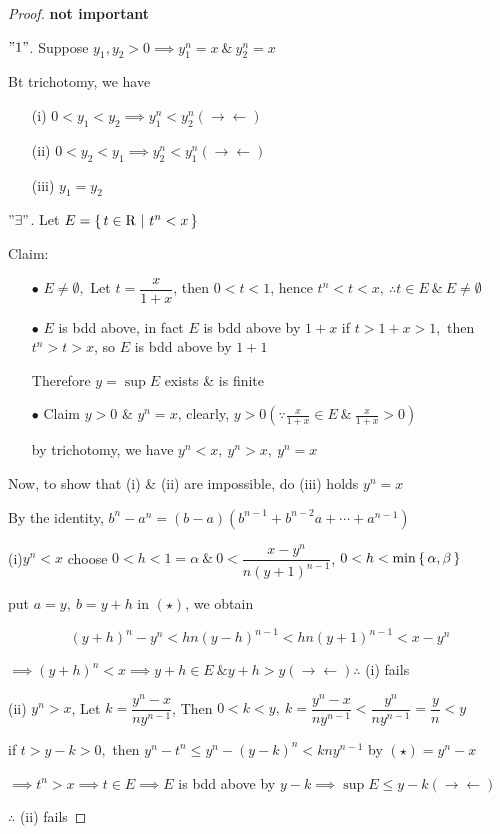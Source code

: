 \begin{proof}
	\textbf{\color{blue} not important}
	
	$"1"$. Suppose $y_1,y_2 > 0 \implies y_1^n = x ~\&~ y_2^n = x$
	
	Bt trichotomy,  we have 
	
	\begin{enumerate}
		\item[(i)]  $0<y_1<y_2 \implies y_1^n < y_2^n (\rightarrow\leftarrow)$
		\item[(ii)] $0 < y_2 < y_1 \implies y_2^n < y_1^n (\rightarrow\leftarrow)$
		\item[(iii)] $y_1 = y_2$
	\end{enumerate}
	
	$"\exists"$. Let $E = \left\{ \,t \in \mathrm{R}~|~t^n < x \,\right\}$
	
	Claim:
	
	\begin{enumerate}
		\item[$\bullet$] $E \neq \emptyset,$ Let $t = \dfrac{x}{1+x}$, then $0<t<1$, hence $t^n < t < x,~ \therefore t \in E ~\&~ E \neq \emptyset$
		\item[$\bullet$] $E$ is bdd above, in fact $E$ is bdd above by $1+x$ if $t>1+x>1,$ then $t^n > t>x$, so $E$ is bdd above by $1+1$
		
		Therefore $y = \sup E$ exists \& is finite
		\item[$\bullet$] Claim $y > 0$ \& $y^n = x$, clearly, $y>0(\because \frac{x}{1+x} \in E ~\&~\frac{x}{1+x}>0 )$
		
		by trichotomy, we have $y^n<x ,~y^n>x,~y^n=x$
	\end{enumerate}
	
	Now, to show that (i) \& (ii) are impossible, do (iii) holds $y^n = x$
	
	By the identity, $b^n - a^n = (b-a)(b^{n-1}+b^{n-2}a+\cdots+a^{n-1})$
	
	(i)$y^n < x$ choose $0 < h < 1 = \alpha ~\&  ~0 < \dfrac{x - y^n}{n(y+1)^{n-1}}$, $0<h<\min \left\{ \,\alpha,\beta \,\right\}$
	
	put $a = y,~ b = y+h$ in $(\star)$, we obtain
	
	$$(y+h)^n - y^n < hn(y-h)^{n-1} < hn(y+1)^{n-1} < x-y^n$$
	
	$\implies (y+h)^n < x \implies y+h \in E ~\& y+h > y (\rightarrow\leftarrow) \therefore$ (i) fails
	\newpage
	
	(ii) $y^n > x$, Let $k = \dfrac{y^n - x}{ny^{n-1}}$, Then $0<k<y,~ k = \dfrac{y^n - x}{ny^{n-1}} < \dfrac{y^n}{ny^{n-1}} = \dfrac{y}{n} < y$
	
	if $t > y-k > 0,$ then $y^n - t^n \leq y^n - (y-k)^n < kny^{n-1}$ by $(\star) = y^n - x$
	
	$\implies t^n > x \implies t \in E \implies E$ is bdd above by $y-k \implies \sup E \leq y-k (\rightarrow\leftarrow)$
	
	$\therefore$ (ii) fails
\end{proof}


